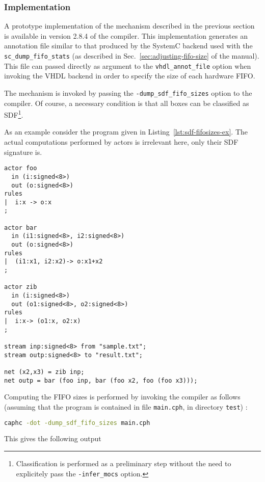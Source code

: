 \subsubsection{Implementation}
\label{sec:moc-class-impl}

A prototype implementation of the mechanism described in the previous section is available in
version 2.8.4 of the compiler.
This implementation generates an annotation file similar to that produced by the SystemC backend
used with the \verb|sc_dump_fifo_stats| (as described in Sec.~\ref{sec:adjusting-fifo-size} of the manual). 
This file can passed directly as argument to the \verb|vhdl_annot_file| option when invoking the
VHDL backend in order to specify the size of each hardware FIFO.

\medskip
The mechanism is invoked by passing the \verb|-dump_sdf_fifo_sizes| option to the compiler. Of
course, a necessary condition is that all boxes can be classified as SDF\footnote{Classification is
  performed as a preliminary step without the need to explicitely pass the
  \texttt{-infer\_mocs} option.}. 

\medskip 
As an example consider the program given in Listing~\ref{lst:sdf-fifosizes-ex}. The actual
computations performed by actors is irrelevant here, only their SDF signature is. 

\begin{lstlisting}[label=lst:sdf-fifosizes-ex,basicstyle=\small]
actor foo
  in (i:signed<8>)
  out (o:signed<8>)
rules
|  i:x -> o:x
;

actor bar
  in (i1:signed<8>, i2:signed<8>)
  out (o:signed<8>)
rules
|  (i1:x1, i2:x2)-> o:x1+x2
;

actor zib
  in (i:signed<8>)
  out (o1:signed<8>, o2:signed<8>)
rules
|  i:x-> (o1:x, o2:x)
;

stream inp:signed<8> from "sample.txt";
stream outp:signed<8> to "result.txt";

net (x2,x3) = zib inp;
net outp = bar (foo inp, bar (foo x2, foo (foo x3)));
\end{lstlisting}


Computing the FIFO sizes is performed by invoking the compiler as follows (assuming that the program is
contained in file \verb|main.cph|, in directory \verb|test|) :

\begin{lstlisting}[language=bash]
caphc -dot -dump_sdf_fifo_sizes main.cph
\end{lstlisting}

\noindent
This gives the following output 

